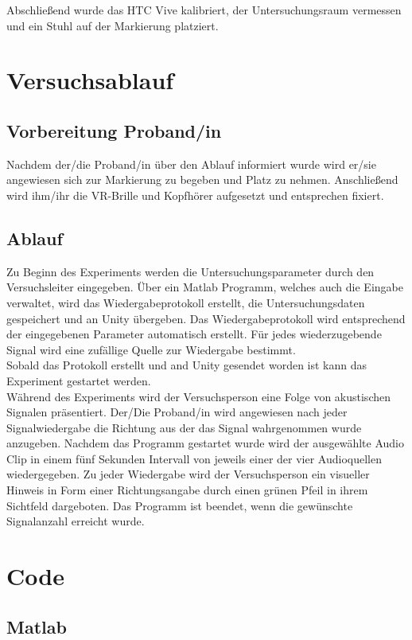 \newpage
Abschließend wurde das HTC Vive kalibriert, der Untersuchungsraum vermessen und ein Stuhl auf der Markierung platziert.
\section{Versuchsablauf}
\subsection{Vorbereitung Proband/in}
Nachdem der/die Proband/in über den Ablauf informiert wurde wird er/sie angewiesen sich zur Markierung zu begeben und Platz zu nehmen. Anschließend wird ihm/ihr die VR-Brille und Kopfhörer aufgesetzt und entsprechen fixiert.

\subsection{Ablauf}
Zu Beginn des Experiments werden die Untersuchungsparameter durch den Versuchsleiter eingegeben. Über ein Matlab Programm, welches auch die Eingabe verwaltet, wird das Wiedergabeprotokoll erstellt, die Untersuchungsdaten gespeichert und an Unity übergeben.
Das Wiedergabeprotokoll wird entsprechend der eingegebenen Parameter automatisch erstellt.
Für jedes wiederzugebende Signal wird eine zufällige Quelle zur Wiedergabe bestimmt.\\
Sobald das Protokoll erstellt und and Unity gesendet worden ist kann das Experiment gestartet werden.\\
Während des Experiments wird der Versuchsperson eine Folge von akustischen Signalen präsentiert. Der/Die Proband/in wird angewiesen nach jeder Signalwiedergabe die Richtung aus der das Signal wahrgenommen wurde anzugeben. Nachdem das Programm gestartet wurde
wird der ausgewählte Audio Clip in einem fünf Sekunden Intervall von jeweils einer der vier Audioquellen wiedergegeben. Zu jeder Wiedergabe wird der Versuchsperson ein visueller Hinweis in Form einer Richtungsangabe durch einen grünen Pfeil in ihrem Sichtfeld dargeboten. Das Programm ist beendet, wenn die gewünschte Signalanzahl erreicht wurde.

\newpage
\section{Code}
\subsection{Matlab}

